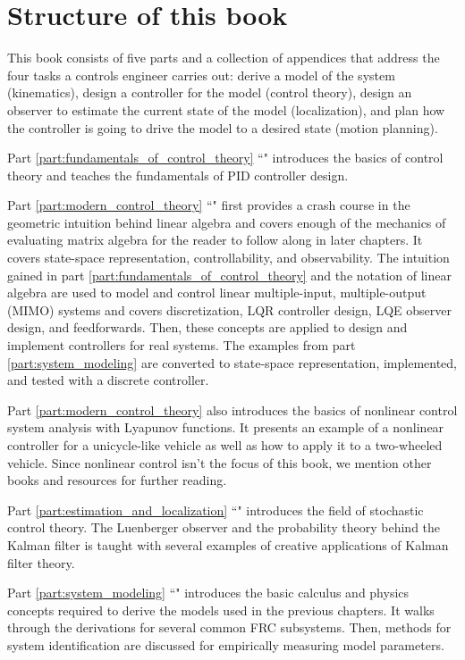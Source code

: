 \section{Structure of this book}

This book consists of five parts and a collection of appendices that address the
four tasks a controls engineer carries out: derive a model of the system
(kinematics), design a controller for the model (control theory), design an
observer to estimate the current state of the model (localization), and plan how
the controller is going to drive the model to a desired state (motion planning).

Part \ref{part:fundamentals_of_control_theory}
``" introduces the basics of
control theory and teaches the fundamentals of PID controller design.

Part \ref{part:modern_control_theory} ``"
first provides a crash course in the geometric intuition behind linear algebra
and covers enough of the mechanics of evaluating matrix algebra for the reader
to follow along in later chapters. It covers state-space representation,
controllability, and observability. The intuition gained in part
\ref{part:fundamentals_of_control_theory} and the notation of linear algebra are
used to model and control linear multiple-input, multiple-output (MIMO) systems
and covers discretization, LQR controller design, LQE observer design, and
feedforwards. Then, these concepts are applied to design and implement
controllers for real systems. The examples from part \ref{part:system_modeling}
are converted to state-space representation, implemented, and tested with a
discrete controller.

Part \ref{part:modern_control_theory} also introduces the basics of nonlinear
control system analysis with Lyapunov functions. It presents an example of a
nonlinear controller for a unicycle-like vehicle as well as how to apply it to a
two-wheeled vehicle. Since nonlinear control isn't the focus of this book, we
mention other books and resources for further reading.

Part \ref{part:estimation_and_localization}
``" introduces the field of stochastic
control theory. The Luenberger observer and the probability theory behind the
Kalman filter is taught with several examples of creative applications of Kalman
filter theory.

Part \ref{part:system_modeling} ``" introduces the
basic calculus and physics concepts required to derive the models used in the
previous chapters. It walks through the derivations for several common FRC
subsystems. Then, methods for system identification are discussed for
empirically measuring model parameters.


